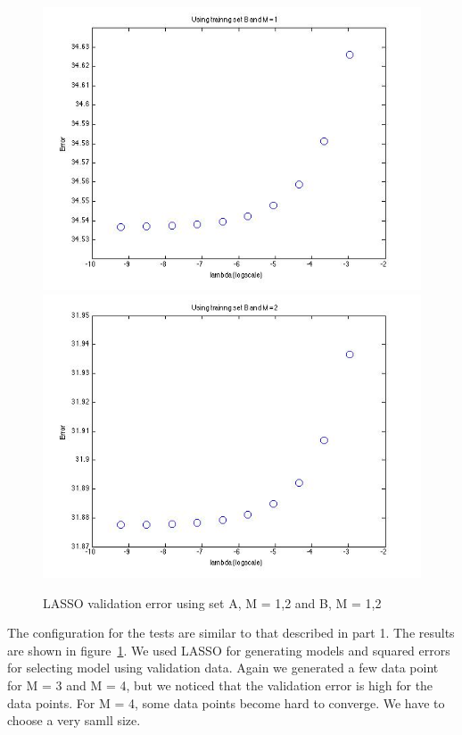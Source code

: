 \begin{figure}[!htb]
\endminipage\hfill
{}                                                                                 \includegraphics[width=\linewidth]{figures/p4_LASSO_regressB_m=1}
\endminipage\hfill
{}
  \includegraphics[width=\linewidth]{figures/p4_LASSO_regressB_m=2}
\endminipage\hfill
\caption{LASSO validation error using set A, M = 1,2 and B, M = 1,2}\label{fig:p4_LASSO}
\end{figure}

The configuration for the tests are similar to that described in part 1. The results are shown in figure~\ref{fig:p4_LASSO}. We used LASSO for generating models and squared errors for selecting model using validation data. Again we generated a few data point for M = 3 and M = 4, but we noticed that the validation error is high for the data points. For M = 4, some data points become hard to converge. We have to choose a very samll size.  
 
